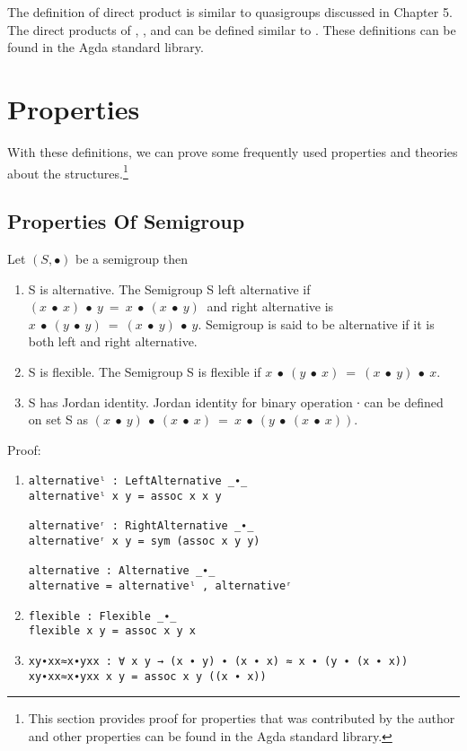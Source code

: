 The definition of direct product is similar to quasigroups discussed in Chapter
5. The direct products of , , and
 can be defined similar to . These
definitions can be found in the Agda standard library.

\section{Properties}
With these definitions, we can prove some frequently used properties and theories
about the structures.\footnote{This section provides proof for properties that
was contributed by the author and other properties can be found in the Agda standard
library.}
\subsection{Properties Of Semigroup}
Let $(S, ∙)$ be a semigroup then
\begin{enumerate}
\item S is alternative. The Semigroup S left alternative if \((x\ ∙\ x)\ ∙\ y\ =\ x\ ∙\ (x\ ∙\ y)\ \) and right alternative is
\(x\ ∙\ (y\ ∙\ y)\ =\ (x\ ∙\ y)\ ∙\ y\). Semigroup is
said to be alternative if it is both left and right alternative. 
\item S is flexible. The Semigroup S is flexible if \(x\ ∙\ (y\
∙\ x)\ =\ (x\ ∙\ y)\ ∙\ x\).
\item S has Jordan identity.  Jordan identity for binary operation ∙ can be
defined on set S as \((x\ ∙\ y)\ ∙\ (x\ ∙\ x)\ =\
x\ ∙\ (y\ ∙\ (x\ ∙\ x)). \)
\end{enumerate}
Proof:
\begin{enumerate}
\item
\begin{verbatim}
alternativeˡ : LeftAlternative _∙_
alternativeˡ x y = assoc x x y

alternativeʳ : RightAlternative _∙_
alternativeʳ x y = sym (assoc x y y)

alternative : Alternative _∙_
alternative = alternativeˡ , alternativeʳ
\end{verbatim}
 \item
\begin{verbatim}
flexible : Flexible _∙_
flexible x y = assoc x y x
\end{verbatim}
\item
\begin{verbatim}
xy∙xx≈x∙yxx : ∀ x y → (x ∙ y) ∙ (x ∙ x) ≈ x ∙ (y ∙ (x ∙ x))
xy∙xx≈x∙yxx x y = assoc x y ((x ∙ x))
\end{verbatim}
\end{enumerate}
